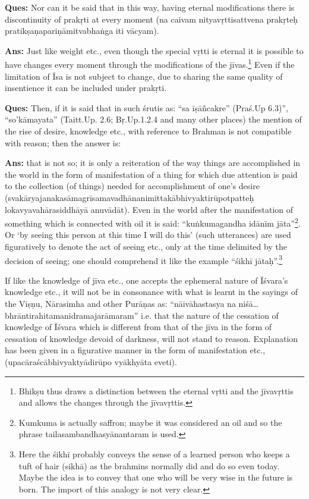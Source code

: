 \textbf{Ques:} Nor can it be said that in this way, having eternal modifications there is discontinuity of prakṛti at every moment (na caivam nityavṛttisattvena prakṛteḥ pratikṣaṇapariṇāmitvabhaṅga iti vācyam). 

\textbf{Ans:} Just like weight etc., even though the special vṛtti is eternal it is possible to have changes every moment through the modifications of the jīvas.\footnote{Bhikṣu thus draws a distinction between the eternal vṛtti and the jīvavṛttis and allows the changes through the jīvavṛttis.} Even if the limitation of Īsa is not subject to change, due to sharing the same quality of insentience it can be included under prakṛti. 

\textbf{Ques:} Then, if it is said that in such śrutis as: “sa īṣāñcakre” (Praś.Up 6.3)”,  “so’kāmayata” (Taitt.Up. 2.6; Bṛ.Up.1.2.4 and many other places) the mention of the rise of desire, knowledge etc., with reference to Brahman is not compatible with reason; then the answer is: 

\textbf{Ans:} that is not so; it is only a reiteration of the way things are accomplished in the world in the form of manifestation of a thing for which due attention is paid to the collection (of things) needed for accomplishment of one’s desire (svakāryajanakasāmagrīsamavadhānanimittakābhivyaktirūpotpatteḥ lokavyavahārasiddhāyā anuvādāt). Even in the world after the manifestation of something which is connected with oil it is said:  “kuṅkumagandha idānīm jāta”\footnote{Kumkuma is actually saffron; maybe it was considered an oil and so the phrase tailasambandhasyānantaram is used.}. Or ‘by seeing this person at this time I will do this’ (such utterances) are used figuratively to denote the act of seeing etc., only at the time delimited by the decision of seeing; one should comprehend it like the example “śikhī jātaḥ”.\footnote{Here the śikhī probably conveys the sense of a learned person who keeps a tuft of hair (sikhā) as the brahmins normally did and do so even today. Maybe the idea is to convey that one who will be very wise in the future is born. The import of this analogy is not very clear.} 

If like the knowledge of jīva etc., one accepts the ephemeral nature of Īśvara’s knowledge etc., it will not be in consonance with what is learnt in the sayings of the Viṣṇu, Nārasimha and other Purāṇas as: “nāivāhastasya na niśā…bhrāntirahitamanidramajarāmaram” i.e. that the nature of the cessation of knowledge of Īśvara which is different from that of the jīva in the form of cessation of knowledge devoid of darkness, will not stand to reason. Explanation has been given in a figurative manner in the form of manifestation etc., (upacāraścābhivyaktyādirūpo vyākhyāta eveti).

